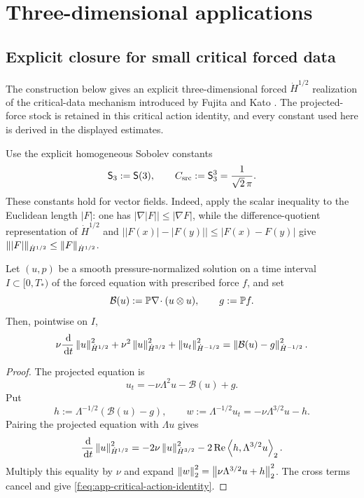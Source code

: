 \section{Three-dimensional applications}
\label{f:sec:three-dimensional-applications}

\subsection{Explicit closure for small critical forced data}

The construction below gives an explicit three-dimensional forced
\(\dot H^{1/2}\) realization of the critical-data mechanism introduced by
Fujita and Kato \cite{FujitaKato1964}.  The projected-force stock is
retained in this critical action identity, and every constant used here
is derived in the displayed estimates.

Use the explicit homogeneous Sobolev constants
\[
 \mathsf S_3:=\mathsf S(3),
 \qquad
 C_{\rm src}:=\mathsf S_3^3=\frac1{\sqrt2\,\pi}.
\]
These constants hold for vector fields.  Indeed, apply the scalar
inequality to the Euclidean length \(|F|\): one has
\(|\nabla|F||\le|\nabla F|\), while the difference-quotient representation of
\(\dot H^{1/2}\) and
\(\bigl||F(x)|-|F(y)|\bigr|\le|F(x)-F(y)|\) give
\(\left\lVert |F|\right\rVert_{\dot H^{1/2}}\le\left\lVert F\right\rVert_{\dot H^{1/2}}\).

\begin{lemma}
\label{f:lem:app-critical-action-identity}
Let \((u,p)\) be a smooth pressure-normalized solution on a time interval
\(I\subset[0,T_*)\) of the forced equation with prescribed force \(f\), and set
\[
 \mathcal B(u):=\mathbb P\nabla\!\cdot(u\otimes u),
 \qquad
 g:=\mathbb P f.
\]
Then, pointwise on \(I\),
\begin{equation}
 \nu\frac{\,\mathrm d}{\,\mathrm d t}\left\lVert u\right\rVert_{\dot H^{1/2}}^2
 +\nu^2\left\lVert u\right\rVert_{\dot H^{3/2}}^2
 +\left\lVert u_t\right\rVert_{\dot H^{-1/2}}^2
 =\left\lVert \mathcal B(u)-g\right\rVert_{\dot H^{-1/2}}^2.
 \label{f:eq:app-critical-action-identity}
\end{equation}
\end{lemma}

\begin{proof}
The projected equation is
\[
 u_t=-\nu\Lambda^2u-\mathcal B(u)+g.
\]
Put
\[
 h:=\Lambda^{-1/2}(\mathcal B(u)-g),
 \qquad
 w:=\Lambda^{-1/2}u_t=-\nu\Lambda^{3/2}u-h.
\]
Pairing the projected equation with \(\Lambda u\) gives
\[
 \frac{\,\mathrm d}{\,\mathrm d t}\left\lVert u\right\rVert_{\dot H^{1/2}}^2
 =-2\nu\left\lVert u\right\rVert_{\dot H^{3/2}}^2
  -2\operatorname{Re}\left\langle h,\Lambda^{3/2}u\right\rangle_2.
\]
Multiply this equality by \(\nu\) and expand
\(\left\lVert w\right\rVert_2^2=\left\lVert \nu\Lambda^{3/2}u+h\right\rVert_2^2\).
The cross terms cancel and give
\eqref{f:eq:app-critical-action-identity}.
\end{proof}

